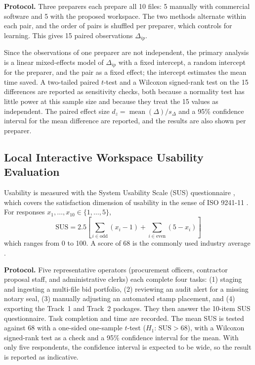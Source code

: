 \textbf{Protocol.} Three preparers each prepare all 10 files: 5 manually with commercial software and 5 with the proposed workspace. The two methods alternate within each pair, and the order of pairs is shuffled per preparer, which controls for learning. This gives 15 paired observations $\Delta_{ip}$.

Since the observations of one preparer are not independent, the primary analysis is a linear mixed-effects model of $\Delta_{ip}$ with a fixed intercept, a random intercept for the preparer, and the pair as a fixed effect; the intercept estimates the mean time saved. A two-tailed paired $t$-test and a Wilcoxon signed-rank test on the 15 differences are reported as sensitivity checks, both because a normality test has little power at this sample size and because they treat the 15 values as independent. The paired effect size $d_z=\operatorname{mean}(\Delta)/s_\Delta$ and a 95\% confidence interval for the mean difference are reported, and the results are also shown per preparer.

\subsection{Local Interactive Workspace Usability Evaluation}
\label{sec:eval_usability}

Usability is measured with the System Usability Scale (SUS) questionnaire \cite{ref60}, which covers the satisfaction dimension of usability in the sense of ISO 9241-11 \cite{ref61}. For responses $x_1,\ldots,x_{10}\in\{1,\ldots,5\}$,
\begin{equation}
\label{eq:sus_score}
\text{SUS} = 2.5 \left[ \sum_{i \in \text{odd}} (x_i - 1) + \sum_{i \in \text{even}} (5 - x_i) \right]
\end{equation}
which ranges from 0 to 100. A score of 68 is the commonly used industry average \cite{ref62}.

\textbf{Protocol.} Five representative operators (procurement officers, contractor proposal staff, and administrative clerks) each complete four tasks: (1) staging and ingesting a multi-file bid portfolio, (2) reviewing an audit alert for a missing notary seal, (3) manually adjusting an automated stamp placement, and (4) exporting the Track~1 and Track~2 packages. They then answer the 10-item SUS questionnaire. Task completion and time are recorded. The mean SUS is tested against 68 with a one-sided one-sample $t$-test ($H_1$: $\mathrm{SUS} > 68$), with a Wilcoxon signed-rank test as a check and a 95\% confidence interval for the mean. With only five respondents, the confidence interval is expected to be wide, so the result is reported as indicative.